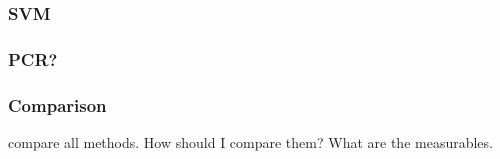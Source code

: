 \subsubsection{SVM}

\subsubsection{PCR?}

\fi

\subsubsection{Comparison} 
compare all methods. 
How should I compare them? 
What are the measurables. 

